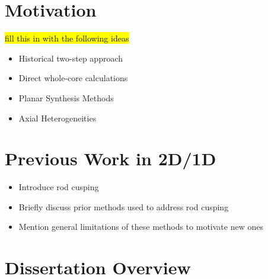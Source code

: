 \section{Motivation}

\hl{fill this in with the following ideas}
\begin{itemize}
    \item Historical two-step approach
    \item Direct whole-core calculations
    \item Planar Synthesis Methods
    \item Axial Heterogeneities
\end{itemize}

\section{Previous Work in 2D/1D}

\begin{itemize}
    \item Introduce rod cusping
    \item Briefly discuss prior methods used to address rod cusping
    \item Mention general limitations of these methods to motivate new ones
\end{itemize}

\section{Dissertation Overview}